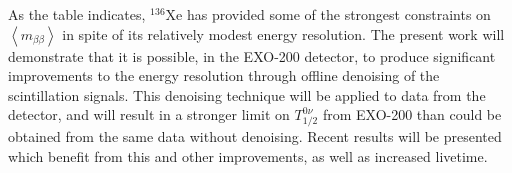 As the table indicates, $^{136}$Xe has provided some of the strongest constraints on $\left< m_{\beta\beta}\right>$ in spite of its relatively modest energy resolution.  The present work will demonstrate that it is possible, in the EXO-200 detector, to produce significant improvements to the energy resolution through offline denoising of the scintillation signals.  This denoising technique will be applied to data from the detector, and will result in a stronger limit on $T_{1/2}^{0\nu}$ from EXO-200 than could be obtained from the same data without denoising.  Recent results will be presented which benefit from this and other improvements, as well as increased livetime.
